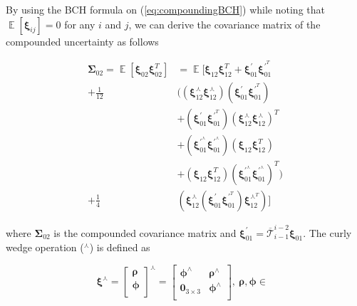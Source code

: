 \documentclass[letterpaper, 10 pt]{ieeeconf}  %
\begin{document}
By using the BCH formula on (\ref{eq:compoundingBCH}) while noting that $\mathop{\mathbb{E}}[\boldsymbol{\xi}_{ij}]=0$ for any $i$ and $j$, we can derive the covariance matrix of the compounded uncertainty as follows \cite{barfoot2014associating}

\begin{equation}
\begin{aligned}
\boldsymbol{\Sigma}_{02} = \mathop{\mathbb{E}}[\boldsymbol{\xi}_{02}\boldsymbol{\xi}^{T}_{02}] &= \mathop{\mathbb{E}}[\boldsymbol{\xi}_{12}\boldsymbol{\xi}^T_{12}+\boldsymbol{\xi}^\prime_{01}\boldsymbol{\xi}^{\prime^T}_{01}\\
+\frac{1}{12}&((\boldsymbol{\xi}^\curlywedge_{12}\boldsymbol{\xi}^\curlywedge_{12})(\boldsymbol{\xi}^\prime_{01}\boldsymbol{\xi}^{\prime^T}_{01})\\
&+(\boldsymbol{\xi}^\prime_{01}\boldsymbol{\xi}^{\prime^T}_{01})(\boldsymbol{\xi}^\curlywedge_{12}\boldsymbol{\xi}^\curlywedge_{12})^T\\
&+(\boldsymbol{\xi}^{\prime^\curlywedge}_{01}\boldsymbol{\xi}^{\prime^\curlywedge}_{01})(\boldsymbol{\xi}_{12}\boldsymbol{\xi}^T_{12})\\
&+(\boldsymbol{\xi}_{12}\boldsymbol{\xi}^T_{12})(\boldsymbol{\xi}^{\prime^\curlywedge}_{01}\boldsymbol{\xi}^{\prime^\curlywedge}_{01})^T)\\
+\frac{1}{4}&(\boldsymbol{\xi}^\curlywedge_{12}(\boldsymbol{\xi}^\prime_{01}\boldsymbol{\xi}^{\prime^T}_{01})\boldsymbol{\xi}^{\curlywedge^T}_{12})]
\label{eq:compoundingsigma}
\end{aligned}
\end{equation}

where $\boldsymbol{\Sigma}_{02}$ is the compounded covariance matrix and $\boldsymbol{\xi}^\prime_{01}=\overline{\mathcal{T}}^{i-2}_{i-1} \boldsymbol{\xi}_{01}$. The curly wedge operation ($^\curlywedge$) is defined as

\begin{equation}
\boldsymbol{\xi}^\curlywedge = 
\begin{bmatrix}
\boldsymbol{\rho} \\
\boldsymbol{\phi} \\
\end{bmatrix}^\curlywedge = 
\begin{bmatrix}
\boldsymbol{\phi}^\wedge & \boldsymbol{\rho}^\wedge \\
\mathbf{0}_{3\times3} & \boldsymbol{\phi}^\wedge\\
\end{bmatrix},~\boldsymbol{\rho}, \boldsymbol{\phi} \in \mathop{\mathbb{R}^3}
\label{eq:curlywedge}
\end{equation}
\end{document}
